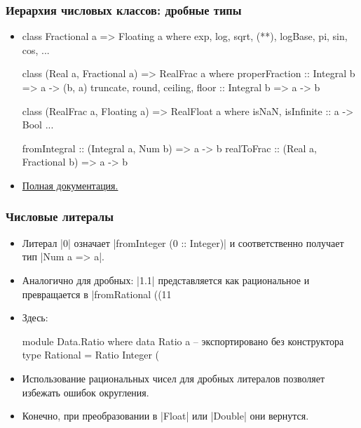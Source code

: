 \documentclass[10pt]{beamer}
\begin{document}
\begin{frame}[fragile]
  \frametitle{Иерархия числовых классов: дробные типы}
  \begin{itemize}
    \item[]
    \begin{haskell}
      class Fractional a => Floating a where 
          exp, log, sqrt, (**), logBase, 
          pi, sin, cos, ...

      class (Real a, Fractional a) => RealFrac a where 
          properFraction :: Integral b => a -> (b, a)
          truncate, round, ceiling, floor :: 
              Integral b => a -> b

      class (RealFrac a, Floating a) => RealFloat a where
          isNaN, isInfinite :: a -> Bool
          ...
          
      fromIntegral :: (Integral a, Num b) => a -> b
      realToFrac :: (Real a, Fractional b) => a -> b
    \end{haskell}
    \item \href{https://hackage.haskell.org/package/base/docs/Prelude.html#g:7}{Полная документация.}
  \end{itemize}
\end{frame}

\begin{frame}[fragile]
  \frametitle{Числовые литералы}
  \begin{itemize}
    \item Литерал \haskinline|0| означает \haskinline|fromInteger (0 :: Integer)| и соответственно получает тип \pause\haskinline|Num a => a|.
    \item Аналогично для дробных: \haskinline|1.1| представляется как рациональное и превращается в \haskinline|fromRational ((11 %
    \item Здесь:
          \begin{haskell}
            module Data.Ratio where
              data Ratio a -- экспортировано без конструктора
              type Rational = Ratio Integer
              (%
          \end{haskell}
          \pause
    \item Использование рациональных чисел для дробных литералов позволяет избежать ошибок округления.\pause
    \item Конечно, при преобразовании в \haskinline|Float| или \haskinline|Double| они вернутся.
  \end{itemize}
\end{frame}
\end{document}

